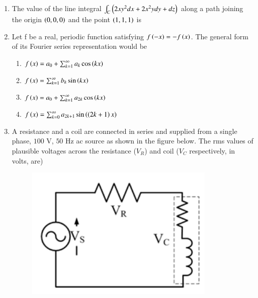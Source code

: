 \documentclass[journal,12pt,onecolumn]{IEEEtran}
\theoremstyle{remark}
\begin{document}
\begin{enumerate}[start=1, label=Q.\arabic*]
    \hfill{}

    \item The value of the line integral $\int_C \left(2xy^2 dx + 2x^2y dy + dz\right)$ along a path joining the origin $\left(0,0,0\right)$ and the point $\left(1,1,1\right)$ is
    \begin{enumerate}
    \end{enumerate}

    \hfill{}

    \item Let f be a real, periodic function satisfying $f\left(-x\right) = -f\left(x\right)$. The general form of its Fourier series representation would be
    \begin{enumerate}
        \item $f\left(x\right) = a_0 + \sum_{k=1}^{\infty} a_k \cos\left(kx\right)$
        \item $f\left(x\right) = \sum_{k=1}^{\infty} b_k \sin\left(kx\right)$
        \item $f\left(x\right) = a_0 + \sum_{k=1}^{\infty} a_{2k} \cos\left(kx\right)$
        \item $f\left(x\right) = \sum_{k=0}^{\infty} a_{2k+1} \sin\left(\left(2k+1\right)x\right)$
    \end{enumerate}

    \hfill{}

    \item A resistance and a coil are connected in series and supplied from a single phase, $100$ V, $50$ Hz ac source as shown in the figure below. The rms values of plausible voltages across the resistance ({$V_R$}) and coil ($V_C$ respectively, in volts, are)
    \begin{figure}[H]
        \includegraphics[width=0.4\columnwidth]{Figures/2q11.png}
        \centering
        \caption{}
    \end{figure}
    \begin{enumerate}
    \end{enumerate}


\end{enumerate}
\end{document}
